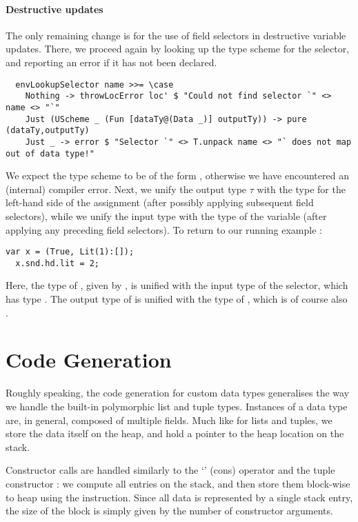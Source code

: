 \paragraph{Destructive updates}
The only remaining change is for the use of field selectors in destructive
variable updates. There, we proceed again by looking up the type scheme for the
selector, and reporting an error if it has not been declared.
\begin{verbatim}
  envLookupSelector name >>= \case
    Nothing -> throwLocError loc' $ "Could not find selector `" <> name <> "`"
    Just (UScheme _ (Fun [dataTy@(Data _)] outputTy)) -> pure (dataTy,outputTy)
    Just _ -> error $ "Selector `" <> T.unpack name <> "` does not map out of data type!"
\end{verbatim}
%
We expect the type scheme to be of the form
, otherwise we have encountered
an (internal) compiler error.
Next, we unify the output type $\tau$ with the type for the left-hand
side of the assignment (after possibly applying subsequent field selectors), while
we unify the input type with the type of the variable (after applying any
preceding field selectors).
To return to our running example :
\begin{lstlisting}[language=SPL]
  var x = (True, Lit(1):[]);
  x.snd.hd.lit = 2;
\end{lstlisting}
%
Here, the type of , given by , is unified with the input type of
the  selector, which has type .
The output type of  is unified with the type of , which is of
course also .



\section{Code Generation} \label{sec:ext-codegen}

Roughly speaking, the code generation for custom data types generalises the way
we handle the built-in polymorphic list and tuple types.
Instances of a data type are, in general, composed of multiple fields.
Much like for lists and tuples, we store the data itself on the heap, and hold
a pointer to the heap location on the stack.

Constructor calls are handled similarly to the `\spl{:}' (cons) operator and the
tuple constructor \spl{($-$,$-$)}: we compute all entries on the stack, and then
store them block-wise to heap using the  instruction.
Since all data is represented by a single stack entry, the size of the block is
simply given by the number of constructor arguments.


